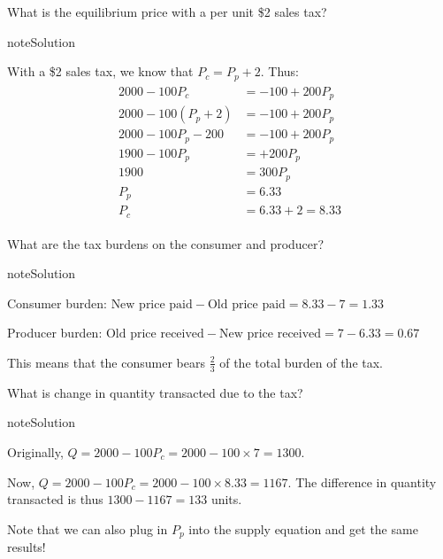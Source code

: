 \documentclass[letterpaper,10pt,english]{jupyterBook}
\begin{document}
\sphinxAtStartPar
{}
What is the equilibrium price with a per unit \$2 sales tax?

\begin{sphinxadmonition}{note}{Solution}

\sphinxAtStartPar
With a \$2 sales tax, we know that \(P_c = P_p + 2\). Thus:
\begin{equation*}
\begin{split}
\begin{align*}
2000 - 100P_c &= -100 + 200 P_p\\
2000 - 100(P_p+2) &= -100 + 200P_p \\
2000 - 100P_p - 200 &= -100 + 200P_p \\
1900 - 100P_p &= + 200P_p \\
1900 &= 300P_p \\
P_p &= 6.33 \\ 
P_c &= 6.33 + 2 = 8.33
\end{align*}
\end{split}
\end{equation*}\end{sphinxadmonition}

\sphinxAtStartPar
{}
What are the tax burdens on the consumer and producer?

\begin{sphinxadmonition}{note}{Solution}

\sphinxAtStartPar
Consumer burden: \(\text{New price paid} - \text{Old price paid} = 8.33 - 7 = 1.33\)

\sphinxAtStartPar
Producer burden: \(\text{Old price received} - \text{New price received} = 7 - 6.33 = 0.67\)

\sphinxAtStartPar
This means that the consumer bears \(\frac{2}{3}\) of the total burden of the tax.
\end{sphinxadmonition}

\sphinxAtStartPar
{}
What is change in quantity transacted due to the tax?

\begin{sphinxadmonition}{note}{Solution}

\sphinxAtStartPar
Originally, \(Q = 2000 - 100P_c = 2000 - 100\times 7 = 1300\).

\sphinxAtStartPar
Now, \(Q = 2000 - 100P_c = 2000 - 100\times 8.33 = 1167\).
The difference in quantity transacted is thus \(1300 - 1167 = 133\) units.

\sphinxAtStartPar
Note that we can also plug in \(P_p\) into the supply equation and get the same results!
\end{sphinxadmonition}
\end{document}

